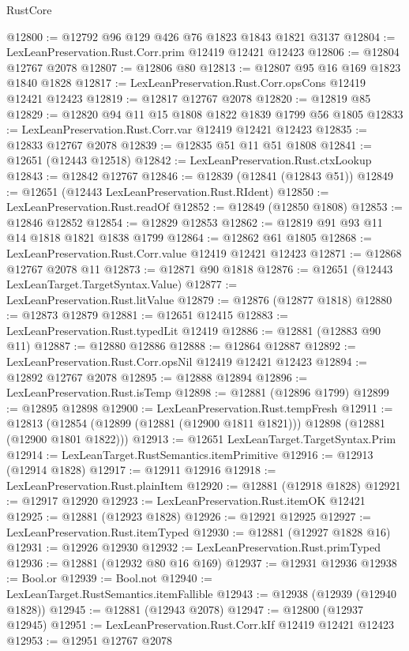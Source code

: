 \begin{lexlean}{RustCore}
\begin{coremodule}
@12800 := @12792 @96 @129 @426 @76 @1823 @1843 @1821 @3137
@12804 := LexLeanPreservation.Rust.Corr.prim @12419 @12421 @12423
@12806 := @12804 @12767 @2078
@12807 := @12806 @80
@12813 := @12807 @95 @16 @169 @1823 @1840 @1828
@12817 := LexLeanPreservation.Rust.Corr.opsCons @12419 @12421 @12423
@12819 := @12817 @12767 @2078
@12820 := @12819 @85
@12829 := @12820 @94 @11 @15 @1808 @1822 @1839 @1799 @56 @1805
@12833 := LexLeanPreservation.Rust.Corr.var @12419 @12421 @12423
@12835 := @12833 @12767 @2078
@12839 := @12835 @51 @11 @51 @1808
@12841 := @12651 (@12443 @12518)
@12842 := LexLeanPreservation.Rust.ctxLookup
@12843 := @12842 @12767
@12846 := @12839 (@12841 (@12843 @51))
@12849 := @12651 (@12443 LexLeanPreservation.Rust.RIdent)
@12850 := LexLeanPreservation.Rust.readOf
@12852 := @12849 (@12850 @1808)
@12853 := @12846 @12852
@12854 := @12829 @12853
@12862 := @12819 @91 @93 @11 @14 @1818 @1821 @1838 @1799
@12864 := @12862 @61 @1805
@12868 := LexLeanPreservation.Rust.Corr.value @12419 @12421 @12423
@12871 := @12868 @12767 @2078 @11
@12873 := @12871 @90 @1818
@12876 := @12651 (@12443 LexLeanTarget.TargetSyntax.Value)
@12877 := LexLeanPreservation.Rust.litValue
@12879 := @12876 (@12877 @1818)
@12880 := @12873 @12879
@12881 := @12651 @12415
@12883 := LexLeanPreservation.Rust.typedLit @12419
@12886 := @12881 (@12883 @90 @11)
@12887 := @12880 @12886
@12888 := @12864 @12887
@12892 := LexLeanPreservation.Rust.Corr.opsNil @12419 @12421 @12423
@12894 := @12892 @12767 @2078
@12895 := @12888 @12894
@12896 := LexLeanPreservation.Rust.isTemp
@12898 := @12881 (@12896 @1799)
@12899 := @12895 @12898
@12900 := LexLeanPreservation.Rust.tempFresh
@12911 := @12813
    (@12854 (@12899 (@12881 (@12900 @1811 @1821))) @12898 (@12881 (@12900 @1801 @1822)))
@12913 := @12651 LexLeanTarget.TargetSyntax.Prim
@12914 := LexLeanTarget.RustSemantics.itemPrimitive
@12916 := @12913 (@12914 @1828)
@12917 := @12911 @12916
@12918 := LexLeanPreservation.Rust.plainItem
@12920 := @12881 (@12918 @1828)
@12921 := @12917 @12920
@12923 := LexLeanPreservation.Rust.itemOK @12421
@12925 := @12881 (@12923 @1828)
@12926 := @12921 @12925
@12927 := LexLeanPreservation.Rust.itemTyped
@12930 := @12881 (@12927 @1828 @16)
@12931 := @12926 @12930
@12932 := LexLeanPreservation.Rust.primTyped
@12936 := @12881 (@12932 @80 @16 @169)
@12937 := @12931 @12936
@12938 := Bool.or
@12939 := Bool.not
@12940 := LexLeanTarget.RustSemantics.itemFallible
@12943 := @12938 (@12939 (@12940 @1828))
@12945 := @12881 (@12943 @2078)
@12947 := @12800 (@12937 @12945)
@12951 := LexLeanPreservation.Rust.Corr.kIf @12419 @12421 @12423
@12953 := @12951 @12767 @2078

\end{coremodule}
\end{lexlean}
